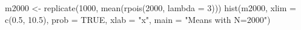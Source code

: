 \begin{Schunk}
\begin{Sinput}
   m2000 <- replicate(1000, mean(rpois(2000, lambda = 3)))
   hist(m2000, xlim = c(0.5, 10.5), prob = TRUE, xlab = "x", main = "Means with N=2000")
\end{Sinput}
\end{Schunk}
